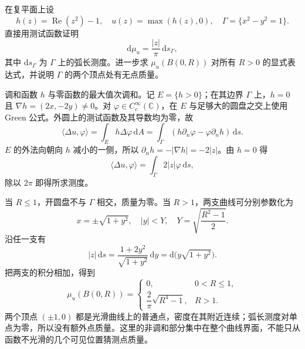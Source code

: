 \begin{exercise}\label{b3:ex:15-draft-04}
在复平面上设
\[
 h(z)=\operatorname{Re}(z^2)-1,\quad u(z)=\max(h(z),0),\quad
 \Gamma=\{x^2-y^2=1\}.
\]
直接用测试函数证明
\[
 \mathrm d\mu_u=\frac{|z|}{\pi}\,\mathrm ds_\Gamma,
\]
其中 \(\mathrm ds_\Gamma\) 为 \(\Gamma\) 上的弧长测度。进一步求 \(\mu_u(B(0,R))\) 对所有 \(R>0\) 的显式表达式，并说明 \(\Gamma\) 的两个顶点处有无点质量。
\end{exercise}
\begin{solution}
调和函数 \(h\) 与零函数的最大值次调和。记 \(E=\{h>0\}\)；在其边界 \(\Gamma\) 上，\(h=0\) 且 \(\nabla h=(2x,-2y)\ne0\)。对 \(\varphi\in C_c^\infty(\mathbb C)\)，在 \(E\) 与足够大的圆盘之交上使用 Green 公式。外圆上的测试函数及其导数均为零，故
\[
 \langle\Delta u,\varphi\rangle
 =\int_E h\Delta\varphi\,\mathrm dA
 =\int_\Gamma(h\partial_n\varphi-\varphi\partial_n h)\,\mathrm ds.
\]
\(E\) 的外法向朝向 \(h\) 减小的一侧，所以 \(\partial_n h=-|\nabla h|=-2|z|\)。由 \(h=0\) 得
\[
 \langle\Delta u,\varphi\rangle
 =\int_\Gamma2|z|\varphi\,\mathrm ds,
\]
除以 \(2\pi\) 即得所求测度。

当 \(R\le1\)，开圆盘不与 \(\Gamma\) 相交，质量为零。当 \(R>1\)，两支曲线可分别参数化为
\[
 x=\pm\sqrt{1+y^2},\quad |y|<Y,\quad
 Y=\sqrt{\frac{R^2-1}{2}}.
\]
沿任一支有
\[
 |z|\,\mathrm ds
 =\frac{1+2y^2}{\sqrt{1+y^2}}\,\mathrm dy
 =\mathrm d\bigl(y\sqrt{1+y^2}\bigr).
\]
把两支的积分相加，得到
\[
 \mu_u(B(0,R))=
 \begin{cases}
 0,&0<R\le1,\\[2pt]
 \dfrac2\pi\sqrt{R^4-1},&R>1.
 \end{cases}
\]
两个顶点 \((\pm1,0)\) 都是光滑曲线上的普通点，密度在其附近连续；弧长测度对单点为零，所以没有额外点质量。这里的非调和部分集中在整个曲线界面，不能只从函数不光滑的几个可见位置猜测点质量。
\end{solution}

